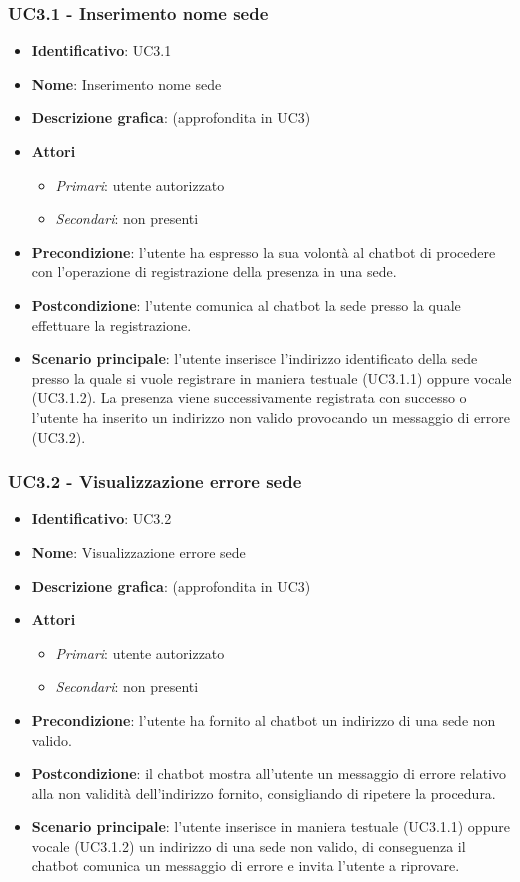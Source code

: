 \subsubsection{UC3.1 - Inserimento nome sede}
\begin{itemize}
    \item \textbf{Identificativo}: UC3.1
    \item \textbf{Nome}: Inserimento nome sede
    \item \textbf{Descrizione grafica}: (approfondita in UC3)
    \item \textbf{Attori}
 \begin{itemize} 
    \item \textit{Primari}: utente autorizzato
    \item \textit{Secondari}: non presenti
 \end{itemize}
 \item \textbf{Precondizione}: l'utente ha espresso la sua volontà al chatbot di procedere con l'operazione di registrazione della presenza in una sede.
 \item \textbf{Postcondizione}: l'utente comunica al chatbot la sede presso la quale effettuare la registrazione.
 \item \textbf{Scenario principale}: l'utente inserisce l'indirizzo identificato della sede presso la quale si vuole registrare in maniera testuale (UC3.1.1) oppure vocale (UC3.1.2). La presenza viene successivamente registrata con successo o l'utente ha inserito un indirizzo non valido provocando un messaggio di errore (UC3.2). 
\end{itemize}

\subsubsection{UC3.2 - Visualizzazione errore sede}
\begin{itemize}
    \item \textbf{Identificativo}: UC3.2
    \item \textbf{Nome}: Visualizzazione errore sede
    \item \textbf{Descrizione grafica}: (approfondita in UC3)
    \item \textbf{Attori}
 \begin{itemize} 
    \item \textit{Primari}: utente autorizzato
    \item \textit{Secondari}: non presenti
 \end{itemize}
 \item \textbf{Precondizione}: l'utente ha fornito al chatbot un indirizzo di una sede non valido.
 \item \textbf{Postcondizione}: il chatbot mostra all'utente un messaggio di errore relativo alla non validità dell'indirizzo fornito, consigliando di ripetere la procedura. 
 \item \textbf{Scenario principale}: l'utente inserisce in maniera testuale (UC3.1.1) oppure vocale (UC3.1.2) un indirizzo di una sede non valido, di conseguenza il chatbot comunica un messaggio di errore e invita l'utente a riprovare. 
\end{itemize}
\newpage